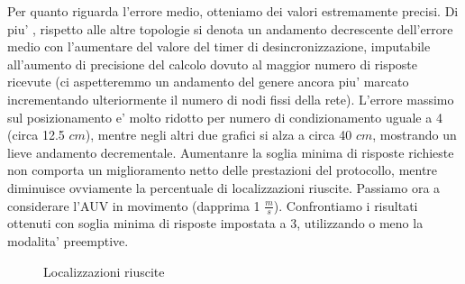 Per quanto riguarda l'errore medio, otteniamo dei valori estremamente precisi. Di piu' , rispetto alle altre topologie si denota un andamento decrescente dell'errore medio con l'aumentare del valore del timer di desincronizzazione, imputabile all'aumento di precisione del calcolo dovuto al maggior numero di risposte ricevute (ci aspetteremmo un andamento del genere ancora piu' marcato incrementando ulteriormente il numero di nodi fissi della rete).
L'errore massimo sul posizionamento e' molto ridotto per numero di condizionamento uguale a 4 (circa 12.5 $cm$), mentre negli altri due grafici si alza a circa 40 $cm$, mostrando un lieve andamento decrementale.
Aumentanre la soglia minima di risposte richieste non comporta un miglioramento netto delle prestazioni del protocollo, mentre diminuisce ovviamente la percentuale di localizzazioni riuscite.
Passiamo ora a considerare l'AUV in movimento (dapprima 1 $\frac{m}{s}$).
Confrontiamo i risultati ottenuti con soglia minima di risposte impostata a 3, utilizzando o meno la modalita' preemptive.
\begin{figure}[H]
    \centering
    \hfill
    \caption{Localizzazioni riuscite}
\end{figure}

